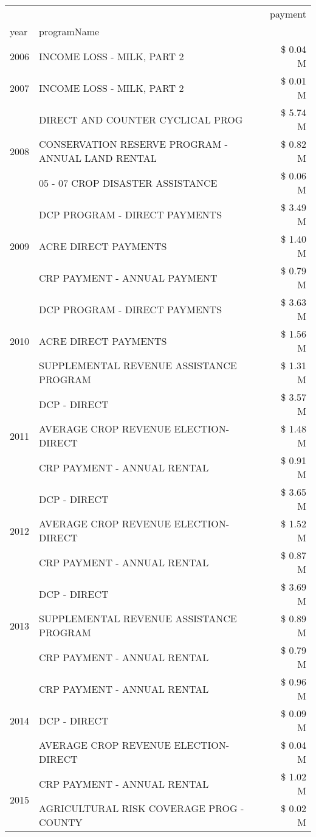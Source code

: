 \begin{tabular}{llr}
\toprule
 &  & payment \\
year & programName &  \\
\midrule
2006 & INCOME LOSS - MILK, PART 2 & \$ 0.04 M \\
\cline{1-3}
2007 & INCOME LOSS - MILK, PART 2 & \$ 0.01 M \\
\cline{1-3}
\multirow[t]{3}{*}{2008} & DIRECT AND COUNTER CYCLICAL PROG & \$ 5.74 M \\
 & CONSERVATION RESERVE PROGRAM - ANNUAL LAND RENTAL & \$ 0.82 M \\
 & 05 - 07 CROP DISASTER ASSISTANCE & \$ 0.06 M \\
\cline{1-3}
\multirow[t]{3}{*}{2009} & DCP PROGRAM - DIRECT PAYMENTS & \$ 3.49 M \\
 & ACRE DIRECT PAYMENTS & \$ 1.40 M \\
 & CRP PAYMENT - ANNUAL PAYMENT & \$ 0.79 M \\
\cline{1-3}
\multirow[t]{3}{*}{2010} & DCP PROGRAM - DIRECT PAYMENTS & \$ 3.63 M \\
 & ACRE DIRECT PAYMENTS & \$ 1.56 M \\
 & SUPPLEMENTAL REVENUE ASSISTANCE PROGRAM & \$ 1.31 M \\
\cline{1-3}
\multirow[t]{3}{*}{2011} & DCP - DIRECT & \$ 3.57 M \\
 & AVERAGE CROP REVENUE ELECTION-DIRECT & \$ 1.48 M \\
 & CRP PAYMENT - ANNUAL RENTAL & \$ 0.91 M \\
\cline{1-3}
\multirow[t]{3}{*}{2012} & DCP - DIRECT & \$ 3.65 M \\
 & AVERAGE CROP REVENUE ELECTION-DIRECT & \$ 1.52 M \\
 & CRP PAYMENT - ANNUAL RENTAL & \$ 0.87 M \\
\cline{1-3}
\multirow[t]{3}{*}{2013} & DCP - DIRECT & \$ 3.69 M \\
 & SUPPLEMENTAL REVENUE ASSISTANCE PROGRAM & \$ 0.89 M \\
 & CRP PAYMENT - ANNUAL RENTAL & \$ 0.79 M \\
\cline{1-3}
\multirow[t]{3}{*}{2014} & CRP PAYMENT - ANNUAL RENTAL & \$ 0.96 M \\
 & DCP - DIRECT & \$ 0.09 M \\
 & AVERAGE CROP REVENUE ELECTION-DIRECT & \$ 0.04 M \\
\cline{1-3}
\multirow[t]{3}{*}{2015} & CRP PAYMENT - ANNUAL RENTAL & \$ 1.02 M \\
 & AGRICULTURAL RISK COVERAGE PROG - COUNTY & \$ 0.02 M \\

\end{tabular}
